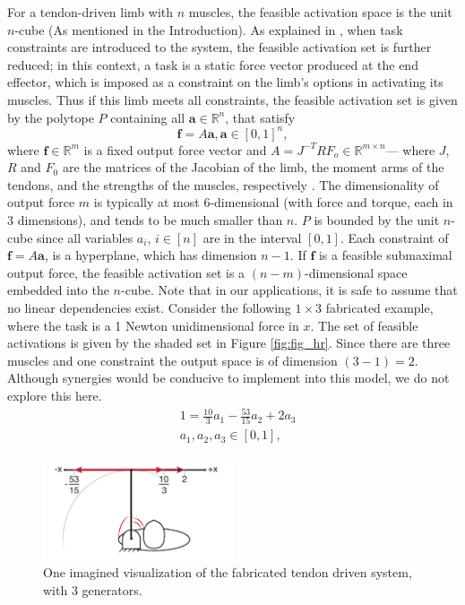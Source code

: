\label{s:methods}
For a tendon-driven limb with $n$ muscles, the feasible activation space is the unit $n$-cube (As mentioned in the Introduction). As explained in \cite{Valero-Cuevas2009mathematical}, when task constraints are introduced to the system, the feasible activation set is further reduced; in this context, a task is a static force vector produced at the end effector, which is imposed as a constraint on the limb's options in activating its muscles. Thus if this limb meets all constraints, the feasible activation set is given by the polytope $P$ containing all $\textbf{a} \in \mathbb{R}^n$, that satisfy
\[\textbf{f} = A\textbf{a}, \textbf{a} \in [0,1]^n,\]
where $\textbf{f} \in \mathbb{R}^m$ is a fixed output force vector and $A = J^{-T}RF_o \in \mathbb{R}^{m \times n}$--- where $J$, $R$ and $F_0$ are the matrices of the Jacobian of the limb, the moment arms of the tendons, and the strengths of the muscles, respectively \cite{Valero-Cuevas1998Large,Valero-Cuevas2009mathematical}.
The dimensionality of output force $m$ is typically at most 6-dimensional (with force and torque, each in 3 dimensions), and tends to be much smaller than $n$.
$P$ is bounded by the unit $n$-cube since all variables $a_i$, $i \in [n]$ are in the interval $[0,1]$. Each constraint of $\textbf{f}= A \textbf{a}$, is a hyperplane, which has dimension $n-1$.
If $\textbf{f}$ is a feasible submaximal output force, the feasible activation set is a $(n-m)$-dimensional space embedded into the $n$-cube.
Note that in our applications, it is safe to assume that no linear dependencies exist.
Consider the following $1 \times 3$ fabricated example, where the task is a 1 Newton unidimensional force in $x$. The set of feasible activations is given by the shaded set in Figure \ref{fig:fig_hr}. Since there are three muscles and one constraint the output space is of dimension $(3-1) = 2$.
Although synergies would be conducive to implement into this model, we do not explore this here.
\begin{align*}
&1 = \frac{10}{3}a_1 - \frac{53}{15}a_2 + 2a_3 \\
&a_1, a_2, a_3 \in [0,1],
\end{align*}

\begin{figure}[schematic_arm]
  \label{fig:schematic_arm}
  \centering
  \includegraphics[width=0.5\textwidth]{figs/schematic_arm_1D.pdf}
  \caption{One imagined visualization of the fabricated tendon driven system, with 3 generators.}
  \label{fig:finger}
\end{figure}


